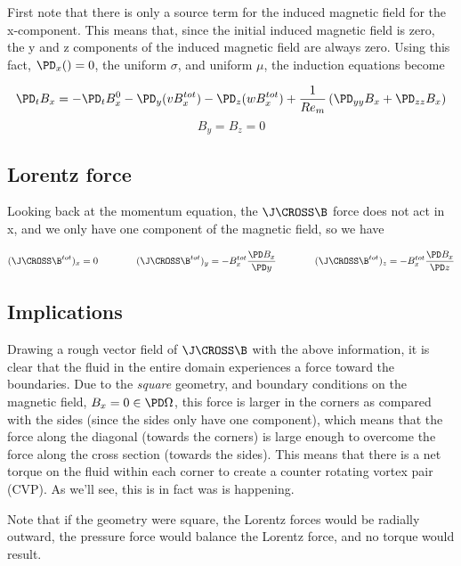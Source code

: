 \documentclass[11pt]{article}
\begin{document}
First note that there is only a source term for the induced magnetic field for the x-component. This means that, since the initial induced magnetic field is zero, the y and z components of the induced magnetic field are always zero. Using this fact, $\PD_x ()=0$, the uniform $\sigma$, and uniform $\mu$, the induction equations become


\begin{equation}
	\PD_t B_x
	=
	- \PD_t B_x^0
	- \PD_y (v B_x^{tot})
	- \PD_z (w B_x^{tot})
	+ \frac{1}{Re_m}
	\left(
	\PD_{yy} B_x
	+
	\PD_{zz} B_x
	\right)
\end{equation}
\begin{equation}
	B_y = B_z = 0
\end{equation}

\subsection{Lorentz force}

Looking back at the momentum equation, the $\J \CROSS \B$ force does not act in x, and we only have one component of the magnetic field, so we have

\begin{equation}
	(\J \CROSS \B^{tot})_x = 0
	\qquad \qquad
	(\J \CROSS \B^{tot})_y = - B_x^{tot} \frac{\PD B_x}{\PD y}
	\qquad \qquad
	(\J \CROSS \B^{tot})_z = - B_x^{tot} \frac{\PD B_x}{\PD z}
\end{equation}


\subsection{Implications}

Drawing a rough vector field of $\J \CROSS \B$ with the above information, it is clear that the fluid in the entire domain experiences a force toward the boundaries. Due to the \textit{square} geometry, and boundary conditions on the magnetic field, $B_x=0 \in \PD \Omega$, this force is larger in the corners as compared with the sides (since the sides only have one component), which means that the force along the diagonal (towards the corners) is large enough to overcome the force along the cross section (towards the sides). This means that there is a net torque on the fluid within each corner to create a counter rotating vortex pair (CVP). As we'll see, this is in fact was is happening.

Note that if the geometry were square, the Lorentz forces would be radially outward, the pressure force would balance the Lorentz force, and no torque would result.
\end{document}
